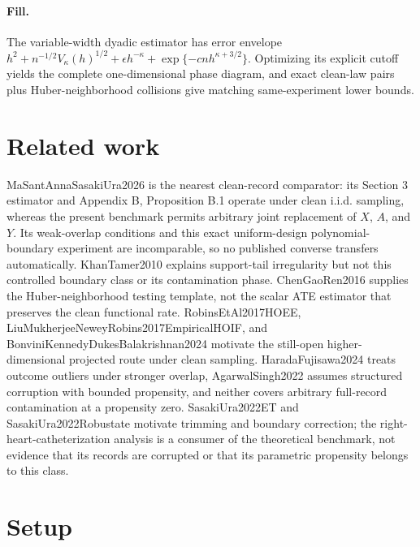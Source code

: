 \documentclass{article}
\begin{document}
\paragraph{Fill.} The variable-width dyadic estimator has error envelope \(h^2+n^{-1/2}V_\kappa(h)^{1/2}+\epsilon h^{-\kappa}+\exp\{-cnh^{\kappa+3/2}\}\). Optimizing its explicit cutoff yields the complete one-dimensional phase diagram, and exact clean-law pairs plus Huber-neighborhood collisions give matching same-experiment lower bounds.

\section{Related work}

MaSantAnnaSasakiUra2026 is the nearest clean-record comparator: its Section 3 estimator and Appendix B, Proposition B.1 operate under clean i.i.d. sampling, whereas the present benchmark permits arbitrary joint replacement of \(X\), \(A\), and \(Y\). Its weak-overlap conditions and this exact uniform-design polynomial-boundary experiment are incomparable, so no published converse transfers automatically. KhanTamer2010 explains support-tail irregularity but not this controlled boundary class or its contamination phase. ChenGaoRen2016 supplies the Huber-neighborhood testing template, not the scalar ATE estimator that preserves the clean functional rate. RobinsEtAl2017HOEE, LiuMukherjeeNeweyRobins2017EmpiricalHOIF, and BonviniKennedyDukesBalakrishnan2024 motivate the still-open higher-dimensional projected route under clean sampling. HaradaFujisawa2024 treats outcome outliers under stronger overlap, AgarwalSingh2022 assumes structured corruption with bounded propensity, and neither covers arbitrary full-record contamination at a propensity zero. SasakiUra2022ET and SasakiUra2022Robustate motivate trimming and boundary correction; the right-heart-catheterization analysis is a consumer of the theoretical benchmark, not evidence that its records are corrupted or that its parametric propensity belongs to this class.

\section{Setup}
\end{document}
